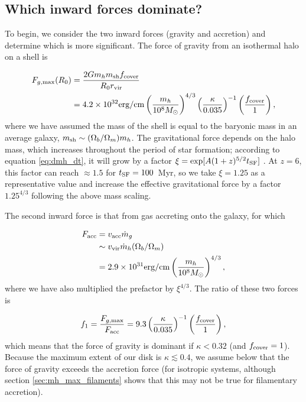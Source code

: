\documentclass[a4paper,11pt]{article}
\begin{document}
\subsection{Which inward forces dominate?}

To begin, we consider the two inward forces (gravity and accretion) and determine which is more significant. The force of gravity from an isothermal halo on a shell is

\begin{equation}
\begin{split}
    F_{g, \rm max} (R_{0}) & = \frac{2 G m_{h} m_{\rm sh} f_{\rm cover}}{R_{0} r_{\rm vir}} \\ & = 4.2\times10^{32} \mathrm{erg/cm} \left( \frac{m_{h}}{10^{8} M_{\odot}} \right)^{4/3} \left( \frac{\kappa}{0.035} \right)^{-1} \left( \frac{f_{\rm cover}}{1} \right),
\end{split}
\end{equation}
%
where we have assumed the mass of the shell is equal to the baryonic mass in an average galaxy, $m_{\rm sh} \sim (\Omega_{b}/\Omega_{m}) m_{h}$. The gravitational force depends on the halo mass, which increases throughout the period of star formation;  according to equation \ref{eq:dmh_dt}, it will grow by a factor $\xi = \exp[A(1+z)^{5/2}t_{\rm SF}]$ . At $z = 6$, this factor can reach $\approx 1.5$ for $t_{\rm SF} = 100$~Myr, so we take $\xi = 1.25$ as a representative value and increase the effective gravitational force by a factor $1.25^{4/3}$ following the above mass scaling.

The second inward force is that from gas accreting onto the galaxy, for which

\begin{equation}
\begin{split}
        F_{\rm acc} & = v_{\rm acc} \dot{m}_{g} \\ & \sim v_{\rm vir} \dot{m}_{h} (\Omega_{b} / \Omega_{m}) \\& = 2.9\times10^{31} \mathrm{erg/cm} \left( \frac{m_{h}}{10^{8} M_{\odot}} \right)^{4/3},
\end{split}
\end{equation}
%
where we have also multiplied the prefactor by $\xi^{4/3}$. The ratio of these two forces is

\begin{equation}
    f_{1} = \frac{F_{g, \rm max}}{F_{\rm acc}} = 9.3 \left( \frac{\kappa}{0.035} \right)^{-1} \left( \frac{f_{\rm cover}}{1} \right),
\end{equation}
%
which means that the force of gravity is dominant if $\kappa < 0.32$ (and $f_{\rm cover} = 1$). Because the maximum extent of our disk is $\kappa \lesssim 0.4$, we assume below that the force of gravity exceeds the accretion force (for isotropic systems, although section \ref{sec:mh_max_filaments} shows that this may not be true for filamentary accretion).
\end{document}
